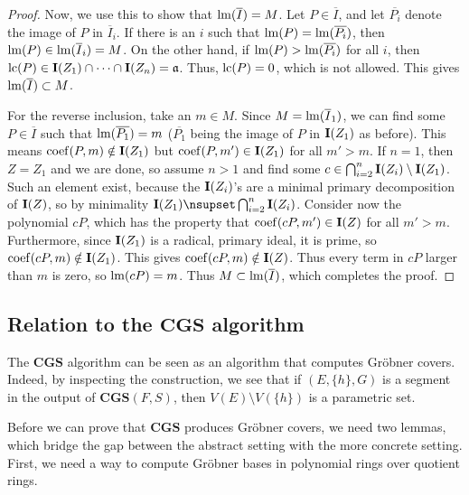 \begin{proof}
  Now, we use this to show that $\operatorname{lm}(\overline I) = M$. Let $P \in \overline I$, and let $\overline{P_{i}}$ denote the image of $P$ in $\overline I_{i}$. If there is an $i$ such that $\operatorname{lm}(P) = \operatorname{lm}(\overline{P_{i}})$, then $\operatorname{lm}(P) \in \operatorname{lm}(\overline I_{i}) = M$. On the other hand, if $\operatorname{lm}(P) > \operatorname{lm}(\overline{P_{i}})$ for all $i$, then $\operatorname{lc}(P) \in \operatorname{\mathbf I}(Z_{1}) \cap \dots \cap \operatorname{\mathbf I}(Z_{n}) = \mathfrak{a}$. Thus, $\operatorname{lc}(P) = 0$, which is not allowed. This gives $\operatorname{lm}(\overline I) \subset M$.

  For the reverse inclusion, take an $m \in M$. Since $M = \operatorname{lm}(\overline I_{1})$, we can find some $P \in \overline I$ such that $\operatorname{lm}(\overline{P_{1}}) = m$ ($\overline{P_{1}}$ being the image of $P$ in $\operatorname{\mathbf I}(Z_{1})$ as before). This means $\operatorname{coef}(P, m) \notin \operatorname{\mathbf I}(Z_{1})$ but $\operatorname{coef}(P, m') \in \operatorname{\mathbf I}(Z_{1})$ for all $m' > m$. If $n = 1$, then $Z = Z_{1}$ and we are done, so assume $n > 1$ and find some $c \in \bigcap_{i=2}^{n} \operatorname{\mathbf I}(Z_{i}) \setminus \operatorname{\mathbf I}(Z_{1})$. Such an element exist, because the $\operatorname{\mathbf I}(Z_{i})$'s are a minimal primary decomposition of $\operatorname{\mathbf I}(Z)$, so by minimality $\I(Z_{1}) \nsupset \bigcap_{i=2}^{n} \I(Z_{i})$. Consider now the polynomial $cP$, which has the property that $\operatorname{coef}(cP, m') \in \operatorname{\mathbf I}(Z)$ for all $m' > m$. Furthermore, since $\operatorname{\mathbf I}(Z_{1})$ is a radical, primary ideal, it is prime, so $\operatorname{coef}(cP, m) \notin \operatorname{\mathbf I}(Z_{1})$. This gives $\operatorname{coef}(cP, m) \notin \operatorname{\mathbf I}(Z)$. Thus every term in $cP$ larger than $m$ is zero, so $\operatorname{lm}(cP) = m$. Thus $M \subset \operatorname{lm}(\overline I)$, which completes the proof.
\end{proof}










\subsection{Relation to the $\mathbf{CGS}$ algorithm} \label{ss_covers}
The $\mathbf{CGS}$ algorithm can be seen as an algorithm that computes Gröbner covers. Indeed, by inspecting the construction, we see that if $(E, \{h\}, G)$ is a segment in the output of $\mathbf{CGS}(F, S)$, then $V(E)  \setminus V(\{h\})$ is a parametric set.

Before we can prove that $\mathbf{CGS}$ produces Gröbner covers, we need two lemmas, which bridge the gap between the abstract setting with the more concrete setting. First, we need a way to compute Gröbner bases in polynomial rings over quotient rings.

